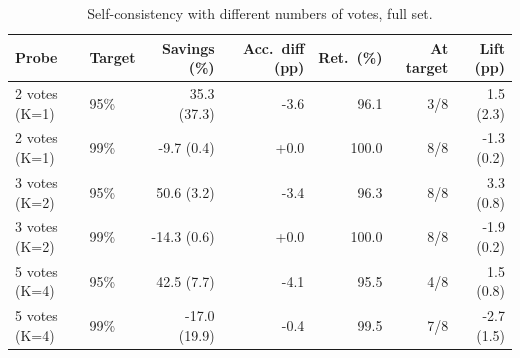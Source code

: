 \begin{table}[!htbp]
\centering\small
\caption{Self-consistency with different numbers of votes, full set.}\label{tab:k_full}
\begin{tabular}{llrrrrr}
\toprule
Probe & Target & Savings (\%) & Acc.\ diff (pp) & Ret.\ (\%) & At target & Lift (pp) \\
\midrule
2 votes (K=1) & 95\% & 35.3 (37.3) & -3.6 & 96.1 & 3/8 & 1.5 (2.3) \\
2 votes (K=1) & 99\% & -9.7 (0.4) & +0.0 & 100.0 & 8/8 & -1.3 (0.2) \\
3 votes (K=2) & 95\% & 50.6 (3.2) & -3.4 & 96.3 & 8/8 & 3.3 (0.8) \\
3 votes (K=2) & 99\% & -14.3 (0.6) & +0.0 & 100.0 & 8/8 & -1.9 (0.2) \\
5 votes (K=4) & 95\% & 42.5 (7.7) & -4.1 & 95.5 & 4/8 & 1.5 (0.8) \\
5 votes (K=4) & 99\% & -17.0 (19.9) & -0.4 & 99.5 & 7/8 & -2.7 (1.5) \\
\bottomrule
\end{tabular}
\end{table}
